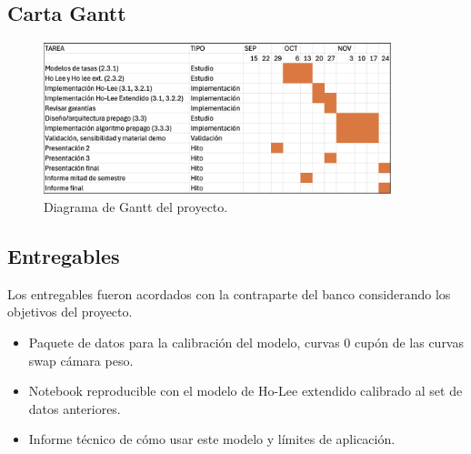 
\subsection{Carta Gantt}
\begin{figure}[H]
    \centering
    \includegraphics[width=0.9\textwidth]{images/gantt.png}
    \caption{Diagrama de Gantt del proyecto.}
    \label{fig:gantt}
\end{figure}

\subsection{Entregables}

Los entregables fueron acordados con la contraparte del banco considerando los objetivos del proyecto.
\begin{itemize}
    \item Paquete de datos para la calibración del modelo, curvas 0 cupón de las curvas swap cámara peso.
    \item Notebook reproducible con el modelo de Ho-Lee extendido calibrado al set de datos anteriores.
    \item Informe técnico de cómo usar este modelo y límites de aplicación.
\end{itemize}
